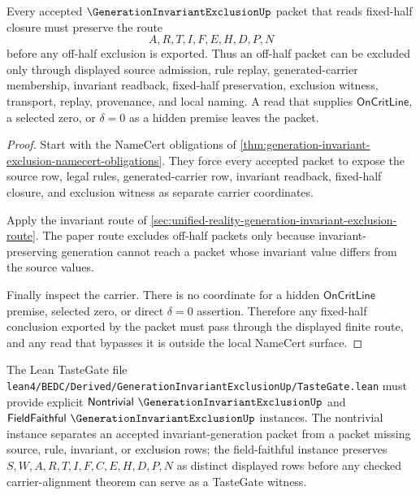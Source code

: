 \begin{theorem}
\label{thm:generation-invariant-exclusion-fixed-half-nonescape}
Every accepted $\GenerationInvariantExclusionUp$ packet that reads fixed-half closure must preserve the route
$$
A,R,T,I,F,E,H,D,P,N
$$
before any off-half exclusion is exported. Thus an off-half packet can be excluded only through displayed source admission, rule replay, generated-carrier membership, invariant readback, fixed-half preservation, exclusion witness, transport, replay, provenance, and local naming. A read that supplies $\mathsf{OnCritLine}$, a selected zero, or $\delta=0$ as a hidden premise leaves the packet.
\end{theorem}
\begin{proof}
Start with the NameCert obligations of \autoref{thm:generation-invariant-exclusion-namecert-obligations}. They force every accepted packet to expose the source row, legal rules, generated-carrier row, invariant readback, fixed-half closure, and exclusion witness as separate carrier coordinates.

Apply the invariant route of \autoref{sec:unified-reality-generation-invariant-exclusion-route}. The paper route excludes off-half packets only because invariant-preserving generation cannot reach a packet whose invariant value differs from the source values.

Finally inspect the carrier. There is no coordinate for a hidden $\mathsf{OnCritLine}$ premise, selected zero, or direct $\delta=0$ assertion. Therefore any fixed-half conclusion exported by the packet must pass through the displayed finite route, and any read that bypasses it is outside the local NameCert surface.
\end{proof}

The Lean TasteGate file \texttt{lean4/BEDC/Derived/GenerationInvariantExclusionUp/TasteGate.lean} must provide explicit $\mathsf{Nontrivial}\ \GenerationInvariantExclusionUp$ and $\mathsf{FieldFaithful}\ \GenerationInvariantExclusionUp$ instances. The nontrivial instance separates an accepted invariant-generation packet from a packet missing source, rule, invariant, or exclusion rows; the field-faithful instance preserves $S,W,A,R,T,I,F,C,E,H,D,P,N$ as distinct displayed rows before any checked carrier-alignment theorem can serve as a TasteGate witness.


